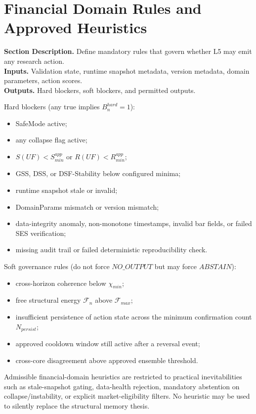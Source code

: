\documentclass[11pt]{report}
\newcommand{\meta}[3]{\textbf{Section Description.} #1\\
\textbf{Inputs.} #2\\
\textbf{Outputs.} #3\par}
\begin{document}
\section{Financial Domain Rules and Approved Heuristics}
\meta{Define mandatory rules that govern whether L5 may emit any research action.}{Validation state, runtime snapshot metadata, version metadata, domain parameters, action scores.}{Hard blockers, soft blockers, and permitted outputs.}

Hard blockers (any true implies $B_n^{hard}=1$):
\begin{itemize}
    \item SafeMode active;
    \item any collapse flag active;
    \item $S(UF)<S_{min}^{app}$ or $R(UF)<R_{min}^{app}$;
    \item GSS, DSS, or DSF-Stability below configured minima;
    \item runtime snapshot stale or invalid;
    \item DomainParams mismatch or version mismatch;
    \item data-integrity anomaly, non-monotone timestamps, invalid bar fields, or failed SES verification;
    \item missing audit trail or failed deterministic reproducibility check.
\end{itemize}

Soft governance rules (do not force $NO\_OUTPUT$ but may force $ABSTAIN$):
\begin{itemize}
    \item cross-horizon coherence below $\chi_{min}$;
    \item free structural energy $\mathcal{F}_n$ above $\mathcal{F}_{max}$;
    \item insufficient persistence of action state across the minimum confirmation count $N_{persist}$;
    \item approved cooldown window still active after a reversal event;
    \item cross-core disagreement above approved ensemble threshold.
\end{itemize}

Admissible financial-domain heuristics are restricted to practical inevitabilities such as stale-snapshot gating, data-health rejection, mandatory abstention on collapse/instability, or explicit market-eligibility filters. No heuristic may be used to silently replace the structural memory thesis.
\end{document}
